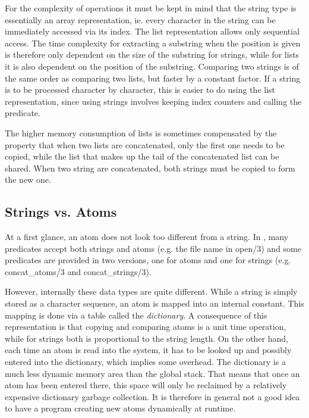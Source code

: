 For the complexity of operations it must be kept in mind that the string type
is essentially an array representation, ie. every character in the string
can be immediately accessed via its index.
The list representation allows only sequential access.
The time complexity for extracting a substring when the position is given
is therefore only dependent on the size of the substring for strings,
while for lists it is also dependent on the position of the substring.
Comparing two strings is of the same order as comparing two lists, but
faster by a constant factor.
If a string is to be processed character by character, this is easier to
do using the list representation, since using strings involves keeping
index counters and calling the  predicate.

The higher memory consumption of lists is sometimes compensated by the
property that when two lists are concatenated, only the first one needs
to be copied, while the list that makes up the tail of the concatenated
list can be shared.
When two string are concatenated, both strings must be copied to form
the new one.

\subsection{Strings vs. Atoms}
At a first glance, an atom does not look too different from a string.
In {\eclipse}, many predicates accept both strings and atoms (e.g. the file name
in open/3) and some predicates are provided in two versions, one for
atoms and one for strings (e.g. concat_atoms/3 and concat_strings/3).

However, internally these data types are quite different.
While a string is simply stored as a character sequence, an atom is mapped
into an internal constant.
This mapping is done via a table called the {\em dictionary}.
A consequence of this representation is that copying and comparing atoms
is a unit time operation, 
while for strings both is proportional to the string length.
On the other hand, each time an atom is read into the system, it has to
be looked up and possibly entered into the dictionary, which implies
some overhead.
The dictionary is a much less dynamic memory area than the global stack.
That means that once an atom has been entered there, this space will
only be reclaimed by a relatively expensive dictionary garbage collection.
It is therefore in general not a good idea to have a
program creating new atoms dynamically at runtime.

